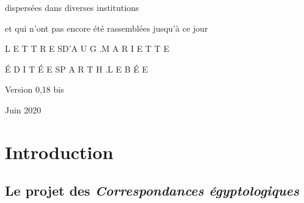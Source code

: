 \documentclass{book}
\begin{document}
\begin{titlepage}
\large dispersées dans diverses institutions
\vspace{1\baselineskip}

et qui n’ont pas encore été rassemblées jusqu’à ce jour
\vspace{9\baselineskip}

\LARGE L E T T R E S\space\space\space D\space ’\space A U G .\space\space\space M A R I E T T E
\vspace{4\baselineskip}

\normalsize É D I T É E S\space\space\space P A R \space\space\space T H .\space\space\space L E B É E
\vspace{4\baselineskip}

Version 0,18 bis
\vspace{1\baselineskip}

Juin 2020
\end{titlepage}

\frontmatter

\chapter*{Introduction}

\section*{Le projet des \textit{Correspondances égyptologiques}}
\end{document}
